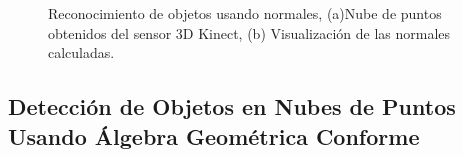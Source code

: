         
        \begin{figure}[!htb] 
        	\centering
        	\caption[Reconocimiento de objetos usando normales.]{Reconocimiento de objetos usando normales, (a)Nube de puntos obtenidos del sensor 3D Kinect, (b) Visualización de las normales calculadas. } 
        	\label{fig:01Antecedentes}
        \end{figure}
    
    
    
    
    
    \subsection{Detección de Objetos en Nubes de Puntos Usando Álgebra Geométrica Conforme}
    
